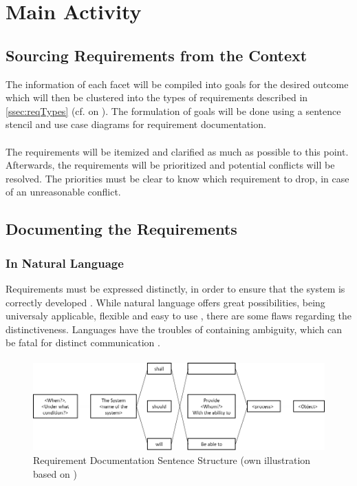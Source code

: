 \section{Main Activity}

\subsection{Sourcing Requirements from the Context}

The information of each facet will be compiled into goals for the desired outcome which will then be clustered into the types of requirements described in \cref{ssec:reqTypes} (cf.  on ). The formulation of goals will be done using a sentence stencil and use case diagrams for requirement documentation. 

\paragraph{} The requirements will be itemized and clarified as much as possible to this point. Afterwards, the requirements will be prioritized and potential conflicts will be resolved. The priorities must be clear to know which requirement to drop, in case of an unreasonable conflict.


\subsection{Documenting the Requirements}

\subsubsection{In Natural Language}
Requirements must be expressed distinctly, in order to ensure that the system is correctly developed \parencites[107]{Ebert.2014}. While natural language offers great possibilities, being universaly applicable, flexible and easy to use \parencite[cf.][239]{Pohl.2007}, there are some flaws regarding the distinctiveness. Languages have the troubles of containing  ambiguity, which can be fatal for distinct communication \parencite[cf.][239-243]{Pohl.2007}.

\paragraph{}
\begin{figure}[H]
    \centering
    \includegraphics[width=\textwidth]{img/SentenceStructure.png}
    \caption{Requirement Documentation Sentence Structure (own illustration based on \cite[246]{Pohl.2007})}
    \label{fig:sentencestructure}
\end{figure}

